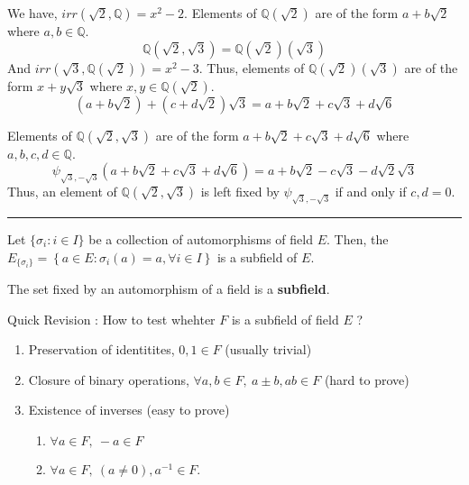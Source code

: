 \begin{commentary}
	We have, $irr(\sqrt{2},\mathbb{Q}) = x^2-2$.
	Elements of $\mathbb{Q}(\sqrt{2})$ are of the form $a+b\sqrt{2}$ where $a,b \in \mathbb{Q}$.
	\[ \mathbb{Q}(\sqrt{2},\sqrt{3}) = \mathbb{Q}(\sqrt{2})(\sqrt{3}) \]
	And $irr(\sqrt{3},\mathbb{Q}(\sqrt{2})) = x^2 -3$.
	Thus, elements of $\mathbb{Q}(\sqrt{2})(\sqrt{3})$ are of the form $x+y\sqrt{3}$ where $x,y \in \mathbb{Q}(\sqrt{2})$.
	\[ \left( a+b\sqrt{2} \right) + \left( c+d\sqrt{2} \right)\sqrt{3} = a+b\sqrt{2}+c\sqrt{3}+d\sqrt{6} \]
\end{commentary}
Elements of $\mathbb{Q}(\sqrt{2},\sqrt{3})$ are of the form $a+b\sqrt{2} + c\sqrt{3}+ d\sqrt{6}$ where $a,b,c,d \in \mathbb{Q}$.
\[ \psi_{\sqrt{3},-\sqrt{3}} \left( a+b\sqrt{2}+c\sqrt{3}+d\sqrt{6} \right) = a+b\sqrt{2}-c\sqrt{3}-d\sqrt{2}\sqrt{3} \]
Thus, an element of $\mathbb{Q}(\sqrt{2},\sqrt{3})$ is left fixed by $\psi_{\sqrt{3},-\sqrt{3}}$ if and only if $c,d = 0$.
\hrule \vspace{1em}
\begin{theorem}
	Let $\{ \sigma_i : i \in I \}$ be a collection of automorphisms of field $E$.
	Then, the $\displaystyle E_{\{\sigma_i\}} = \left\{ a \in E : \sigma_i(a) = a, \forall i \in I \right\}$ is a subfield of $E$.
\end{theorem}
\begin{important}
	The set fixed by an automorphism of a field is a \textbf{subfield}.\\
\end{important}
\begin{commentary}
	Quick Revision : How to test whehter $F$ is a subfield of field $E$ ?
	\begin{enumerate}
		\item Preservation of identitites, $0,1 \in F$ (usually trivial)
		\item Closure of binary operations, $\forall a,b \in F,\ a\pm b, ab \in F$ (hard to prove)
		\item Existence of inverses (easy to prove)
			\begin{enumerate}
				\item $\forall a \in F,\ -a \in F$
				\item $\forall a \in F,\ (a \ne 0), a^{-1} \in F$.
			\end{enumerate}
	\end{enumerate}
\end{commentary}
